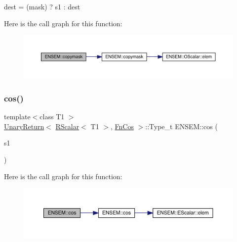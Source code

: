 dest = (mask) ? s1 \+: dest 

Here is the call graph for this function\+:\nopagebreak
\begin{figure}[H]
\begin{center}
\leavevmode
\includegraphics[width=350pt]{d9/ded/group__rscalar_ga2bfebcfc9a340228eb6b4449967f1fa0_cgraph}
\end{center}
\end{figure}
\mbox{\label{group__rscalar_ga5d977b28190b3cf44c5ef2aa98af9156}} 
\subsubsection{\texorpdfstring{cos()}{cos()}}
{\footnotesize\ttfamily template$<$class T1 $>$ \\
\mbox{\hyperlink{structENSEM_1_1UnaryReturn}{Unary\+Return}}$<$ \mbox{\hyperlink{classENSEM_1_1RScalar}{R\+Scalar}}$<$ T1 $>$, \mbox{\hyperlink{structENSEM_1_1FnCos}{Fn\+Cos}} $>$\+::Type\+\_\+t E\+N\+S\+E\+M\+::cos (\begin{DoxyParamCaption}\item[{const \mbox{\hyperlink{classENSEM_1_1RScalar}{R\+Scalar}}$<$ T1 $>$ \&}]{s1 }\end{DoxyParamCaption})\hspace{0.3cm}{\ttfamily [inline]}}

Here is the call graph for this function\+:\nopagebreak
\begin{figure}[H]
\begin{center}
\leavevmode
\includegraphics[width=350pt]{d9/ded/group__rscalar_ga5d977b28190b3cf44c5ef2aa98af9156_cgraph}
\end{center}
\end{figure}
\mbox{\label{group__rscalar_ga7555010fd1580f0b6a1d85cd4e925ce1}} 
